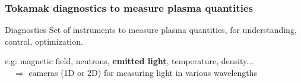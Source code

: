 \documentclass[10pt]{beamer}
\begin{document}
\begin{frame}
\frametitle{Tokamak diagnostics to measure plasma quantities}
    
\begin{alertblock}{Diagnostics}
Set of instruments to measure plasma quantities, for understanding, control, optimization.
\end{alertblock}

e.g: magnetic field, neutrons, \textbf{emitted light}, temperature, density...\\[1cm]


$\quad \Rightarrow$ cameras (1D or 2D) for measuring light in various wavelengths
 

%
%
%
%
%



\end{frame}


%    
%    	
%    	
%    	
%
%
\end{document}
